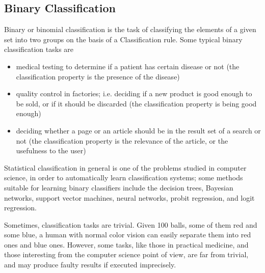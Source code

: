 \subsection{Binary Classification}

Binary or binomial classification is the task of classifying the elements of a given set into two groups on the basis of a Classification rule. Some typical binary classification tasks are

\begin{itemize}
\item medical testing to determine if a patient has certain disease or not (the classification property is the presence of the disease)
\item quality control in factories; i.e. deciding if a new product is good enough to be sold, or if it should be discarded (the classification property is being good enough)
\item deciding whether a page or an article should be in the result set of a search or not (the classification property is the relevance of the article, or the usefulness to the user)
\end{itemize}
Statistical classification in general is one of the problems studied in computer science, in order to automatically learn classification systems; some methods suitable for learning binary classifiers include the decision trees, Bayesian networks, support vector machines, neural networks, probit regression, and logit regression.

Sometimes, classification tasks are trivial. Given 100 balls, some of them red and some blue, a human with normal color vision can easily separate them into red ones and blue ones. However, some tasks, like those in practical medicine, and those interesting from the computer science point of view, are far from trivial, and may produce faulty results if executed imprecisely.

